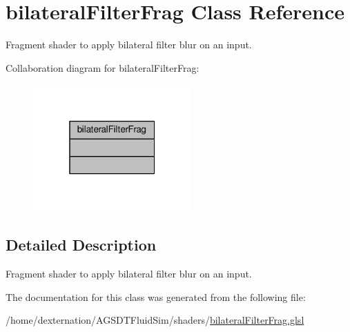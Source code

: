 \hypertarget{classbilateral_filter_frag}{\section{bilateral\-Filter\-Frag Class Reference}
\label{classbilateral_filter_frag}
}


Fragment shader to apply bilateral filter blur on an input.  




Collaboration diagram for bilateral\-Filter\-Frag\-:\nopagebreak
\begin{figure}[H]
\begin{center}
\leavevmode
\includegraphics[width=172pt]{classbilateral_filter_frag__coll__graph}
\end{center}
\end{figure}


\subsection{Detailed Description}
Fragment shader to apply bilateral filter blur on an input. 

The documentation for this class was generated from the following file\-:\begin{DoxyCompactItemize}
\item 
/home/dexternation/\-A\-G\-S\-D\-T\-Fluid\-Sim/shaders/\hyperlink{bilateral_filter_frag_8glsl}{bilateral\-Filter\-Frag.\-glsl}\end{DoxyCompactItemize}
